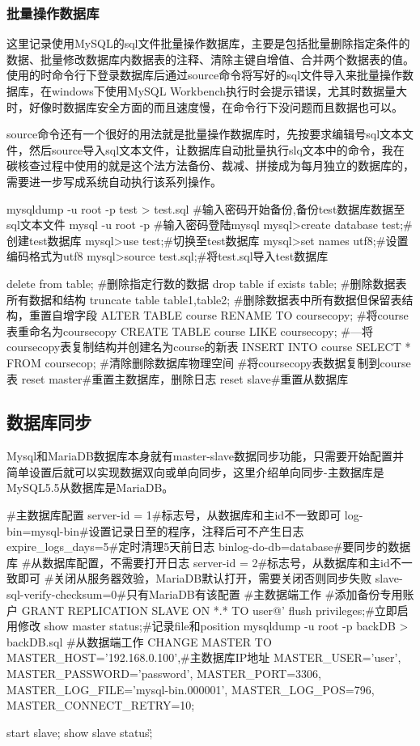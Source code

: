 \subsubsection{批量操作数据库}
这里记录使用MySQL的sql文件批量操作数据库，主要是包括批量删除指定条件的数据、批量修改数据库内数据表的注释、清除主键自增值、合并两个数据表的值。使用的时命令行下登录数据库后通过source命令将写好的sql文件导入来批量操作数据库，在windows下使用MySQL Workbench执行时会提示错误，尤其时数据量大时，好像时数据库安全方面的而且速度慢，在命令行下没问题而且数据也可以。

source命令还有一个很好的用法就是批量操作数据库时，先按要求编辑号sql文本文件，然后source导入sql文本文件，让数据库自动批量执行slq文本中的命令，我在碳核查过程中使用的就是这个法方法备份、裁减、拼接成为每月独立的数据库的，需要进一步写成系统自动执行该系列操作。
\begin{shell}
mysqldump -u root -p test > test.sql
#输入密码开始备份,备份test数据库数据至sql文本文件
mysql -u root -p
#输入密码登陆mysql
mysql>create database test;#创建test数据库
mysql>use test;#切换至test数据库
mysql>set names utf8;#设置编码格式为utf8
mysql>source test.sql;#将test.sql导入test数据库
\end{shell}
\begin{shell}
delete from table;
#删除指定行数的数据
drop table if exists table;
#删除数据表所有数据和结构
truncate table table1,table2;
#删除数据表中所有数据但保留表结构，重置自增字段
ALTER TABLE course RENAME TO coursecopy;
#将course表重命名为coursecopy
CREATE TABLE course LIKE coursecopy;
#—将coursecopy表复制结构并创建名为course的新表
INSERT INTO course SELECT * FROM coursecop;
#清除删除数据库物理空间
#将coursecopy表数据复制到course表
reset master#重置主数据库，删除日志
reset slave#重置从数据库

\end{shell}
\subsection{数据库同步}
Mysql和MariaDB数据库本身就有master-slave数据同步功能，只需要开始配置并简单设置后就可以实现数据双向或单向同步，这里介绍单向同步-主数据库是MySQL5.5从数据库是MariaDB。
\begin{shell}
#主数据库配置
server-id = 1#标志号，从数据库和主id不一致即可
log-bin=mysql-bin#设置记录日至的程序，注释后可不产生日志
expire_logs_days=5#定时清理5天前日志
binlog-do-db=database#要同步的数据库
#从数据库配置，不需要打开日志
server-id = 2#标志号，从数据库和主id不一致即可
#关闭从服务器效验，MariaDB默认打开，需要关闭否则同步失败
slave-sql-verify-checksum=0#只有MariaDB有该配置
#主数据端工作
#添加备份专用账户
GRANT REPLICATION SLAVE ON *.* TO user@'%
flush privileges;#立即启用修改
show master status;#记录file和position
mysqldump -u root -p backDB > backDB.sql
#从数据端工作
CHANGE MASTER TO
MASTER_HOST='192.168.0.100',#主数据库IP地址
MASTER_USER='user',
MASTER_PASSWORD='password',
MASTER_PORT=3306,
MASTER_LOG_FILE='mysql-bin.000001',
MASTER_LOG_POS=796,
MASTER_CONNECT_RETRY=10;

start slave;
show slave status\G;

\end{shell}
